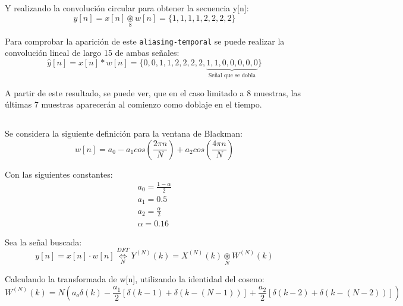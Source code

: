 				 Y realizando la convolución circular para obtener la secuencia y[n]:
				 \begin{equation}
				 	y[n] = x[n] \underset{8}{\circledast} w[n] = \{1,1,1,1,2,2,2,2\} 
				 \end{equation}
				
				Para comprobar la aparición de este \texttt{aliasing-temporal} se puede realizar la convolución lineal de largo 15 de ambas señales:
				\begin{equation}
				\hat{y}[n] = x[n] * w[n] =  \{ 0,0,1,1,2,2,2,2,\underbrace{1,1,0,0,0,0,0 }_{\text{Señal que se dobla}} \}
				\end{equation}
				
				A partir de este resultado, se puede ver, que en el caso limitado a 8 muestras, las últimas 7 muestras aparecerán al comienzo como doblaje en el tiempo. 
				

	\subsection{} %
		Se considera la siguiente definición para la ventana de Blackman:
		\begin{equation}
			w[n] = a_{0} - a_{1}cos\left(\frac{2\pi n}{N} \right) + a_{2}cos\left(\frac{4\pi n}{N} \right)
			\label{eq:2_4_blackman_def}
		\end{equation}
		
		Con las siguientes constantes:
		\begin{gather*}
			a_{0} = \frac{1-\alpha}{2} \\
			a_{1} = 0.5 \\
			a_{2} = \frac{\alpha}{2} \\
			\alpha = 0.16
		\end{gather*}
		
		Sea la señal buscada:
		\begin{equation}
			y[n] = x[n] \cdot w[n] \underset{N}{\overset{DFT}{ \Longleftrightarrow }} Y^{(N)}(k) = X^{(N)}(k) \underset{N}{\circledast} W^{(N)}(k)
		\end{equation}
		
		Calculando la transformada de w[n], utilizando la identidad del coseno:
		\begin{equation}
			W^{(N)}(k) = N \left( a_{o}\delta(k) - \frac{a_{1}}{2} \left[ \delta(k-1) + \delta(k-(N-1)) \right] + \frac{a_{2}}{2} \left[ \delta(k-2) + \delta(k-(N-2)) \right] \right)
		\end{equation}
		
